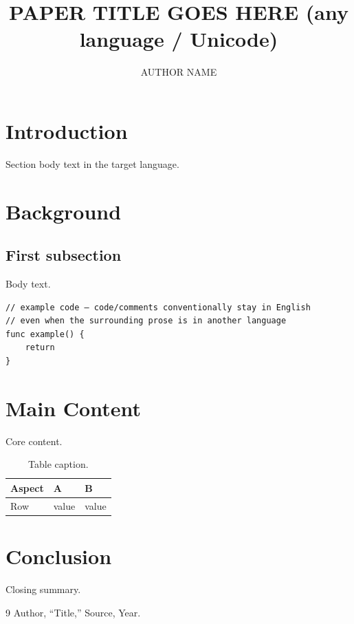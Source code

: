 \documentclass[10pt,twocolumn]{article}
\title{\bfseries PAPER TITLE GOES HERE (any language / Unicode)}
\author{AUTHOR NAME}
\affil{AFFILIATION / DATE LINE}
\date{}
\begin{document}

\section{Introduction}
Section body text in the target language.

\section{Background}

\subsection{First subsection}
Body text.

\begin{lstlisting}[caption={Caption text.}]
// example code — code/comments conventionally stay in English
// even when the surrounding prose is in another language
func example() {
    return
}
\end{lstlisting}

\section{Main Content}
Core content.

\begin{table}[htbp]
\centering
\small
\caption{Table caption.}
\label{tab:example}
\begin{tabular}{p{1.6cm}p{2.3cm}p{2.2cm}}
\hline
\textbf{Aspect} & \textbf{A} & \textbf{B} \\
\hline
Row & value & value \\
\hline
\end{tabular}
\end{table}

\section{Conclusion}
Closing summary.

\begin{thebibliography}{9}
\small
{} Author, ``Title,'' Source, Year.
\end{thebibliography}
\end{document}
